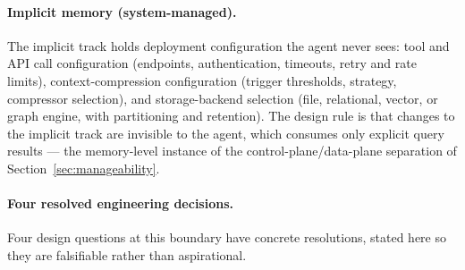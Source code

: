 \paragraph{Implicit memory (system-managed).}
The implicit track holds deployment configuration the agent never sees: tool and API call configuration (endpoints, authentication, timeouts, retry and rate limits), context-compression configuration (trigger thresholds, strategy, compressor selection), and storage-backend selection (file, relational, vector, or graph engine, with partitioning and retention). The design rule is that changes to the implicit track are invisible to the agent, which consumes only explicit query results --- the memory-level instance of the control-plane/data-plane separation of Section~\ref{sec:manageability}.

\paragraph{Four resolved engineering decisions.}
Four design questions at this boundary have concrete resolutions, stated here so they are falsifiable rather than aspirational.
